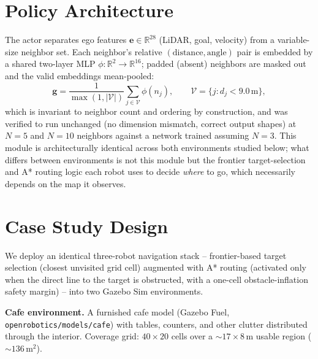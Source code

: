 \documentclass[12pt]{article}
\newcommand{\si}[1]{\mathrm{#1}}
\begin{document}
\section{Policy Architecture}
\label{sec:arch}
The actor separates ego features $\mathbf{e}\in\mathbb{R}^{28}$ (LiDAR, goal,
velocity) from a variable-size neighbor set. Each neighbor's relative
$(\text{distance}, \text{angle})$ pair is embedded by a shared two-layer MLP
$\phi:\mathbb{R}^2\to\mathbb{R}^{16}$; padded (absent) neighbors are masked
out and the valid embeddings mean-pooled:
\begin{equation}
\mathbf{g} = \frac{1}{\max(1,|\mathcal{V}|)}\sum_{j\in\mathcal{V}} \phi(n_j),
\qquad \mathcal{V}=\{j: d_j < 9.0\,\si{m}\},
\end{equation}
which is invariant to neighbor count and ordering by construction, and was
verified to run unchanged (no dimension mismatch, correct output shapes) at
$N=5$ and $N=10$ neighbors against a network trained assuming $N=3$. This
module is architecturally identical across both environments studied below;
what differs between environments is not this module but the frontier
target-selection and A* routing logic each robot uses to decide
\emph{where} to go, which necessarily depends on the map it observes.

\section{Case Study Design}
\label{sec:design}
We deploy an identical three-robot navigation stack -- frontier-based target
selection (closest unvisited grid cell) augmented with A* routing (activated
only when the direct line to the target is obstructed, with a one-cell
obstacle-inflation safety margin) -- into two Gazebo Sim environments.

\textbf{Cafe environment.} A furnished cafe model (Gazebo Fuel,
\texttt{openrobotics/models/cafe}) with tables, counters, and other clutter
distributed through the interior. Coverage grid: $40\times20$ cells over a
$\sim17\times8\,$m usable region ($\sim136\,\si{m}^2$).
\end{document}
